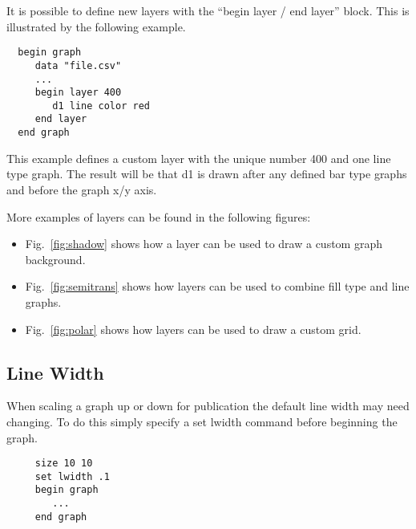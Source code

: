 It is possible to define new layers with the ``begin layer / end layer'' block. This is illustrated by the following example.

\preglecode{}
\begin{Verbatim}
  begin graph
     data "file.csv"
     ...
     begin layer 400
        d1 line color red
     end layer
  end graph
\end{Verbatim}
\postglecode{}

This example defines a custom layer with the unique number 400 and one line type graph. The result will be that d1 is drawn after any defined bar type graphs and before the graph x/y axis.

More examples of layers can be found in the following figures:

\begin{itemize}
\item Fig.~\ref{fig:shadow} shows how a layer can be used to draw a custom graph background.

\item Fig.~\ref{fig:semitrans} shows how layers can be used to combine fill type and line graphs.

\item Fig.~\ref{fig:polar} shows how layers can be used to draw a custom grid.
\end{itemize}

\subsection{Line Width}
When scaling a graph up or down for publication the default
line width may need changing. To do this simply
specify a {\sf set lwidth} command before beginning the graph.

\preglecode{}
\begin{Verbatim}
     size 10 10
     set lwidth .1
     begin graph
        ...
     end graph
\end{Verbatim}
\postglecode{}
